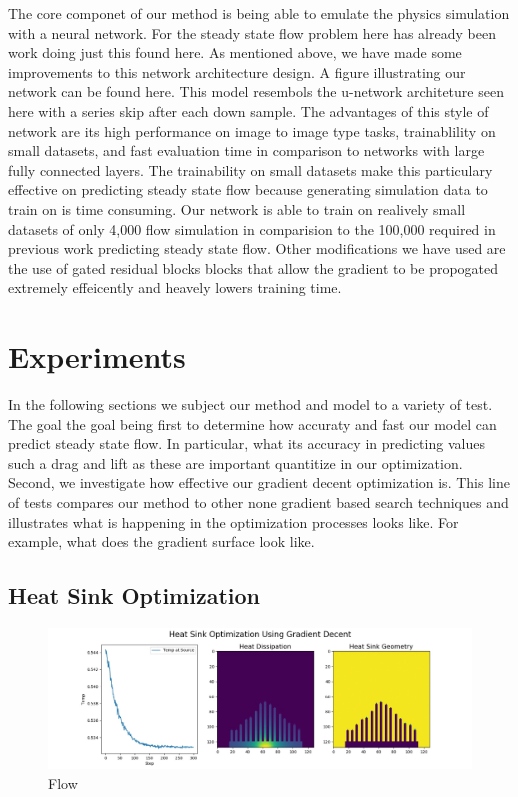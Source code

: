 \documentclass{article} %
\begin{document}
The core componet of our method is being able to emulate the physics simulation with a neural network. For the steady state flow problem here has already been work doing just this found here. As mentioned above, we have made some improvements to this network architecture design. A figure illustrating our network can be found here. This model resembols the u-network architeture seen here with a series skip after each down sample. The advantages of this style of network are its high performance on image to image type tasks, trainablility on small datasets, and fast evaluation time in comparison to networks with large fully connected layers. The trainability on small datasets make this particulary effective on predicting steady state flow because generating simulation data to train on is time consuming. Our network is able to train on realively small datasets of only 4,000 flow simulation in comparision to the 100,000 required in previous work predicting steady state flow. Other modifications we have used are the use of gated residual blocks blocks that allow the gradient to be propogated extremely effeicently and heavely lowers training time.

\section{Experiments}

In the following sections we subject our method and model to a variety of test. The goal the goal being first to determine how accuraty and fast our model can predict steady state flow. In particular, what its accuracy in predicting values such a drag and lift as these are important quantitize in our optimization. Second, we investigate how effective our gradient decent optimization is. This line of tests compares our method to other none gradient based search techniques and illustrates what is happening in the optimization processes looks like. For example, what does the gradient surface look like.

\subsection{Heat Sink Optimization}

\begin{figure}[!t]
\includegraphics[scale=0.30]{../test/figs/heat_learn_gradient_decent.jpeg}
\caption{Flow}
\end{figure}
\end{document}
